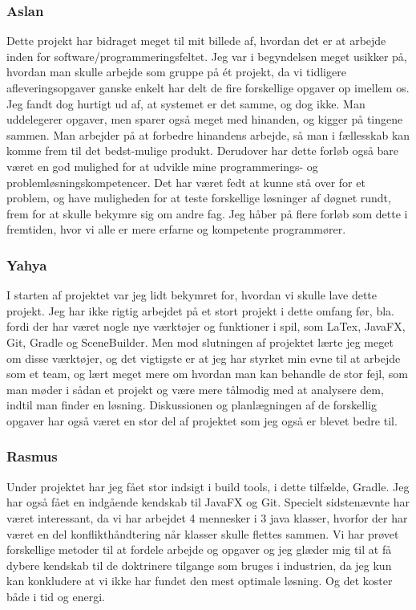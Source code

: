 \subsubsection{Aslan}\label{HHVLA}
Dette projekt har bidraget meget til mit billede af, hvordan det er at arbejde inden for software/programmeringsfeltet. Jeg var i begyndelsen meget usikker på, hvordan man skulle arbejde som gruppe på ét projekt, da vi tidligere afleveringsopgaver ganske enkelt har delt de fire forskellige opgaver op imellem os. Jeg fandt dog hurtigt ud af, at systemet er det samme, og dog ikke. Man uddelegerer opgaver, men sparer også meget med hinanden, og kigger på tingene sammen. Man arbejder på at forbedre hinandens arbejde, så man i fællesskab kan komme frem til det bedst-mulige produkt. Derudover har dette forløb også bare været en god mulighed for at udvikle mine programmerings- og problemløsningskompetencer. Det har været fedt at kunne stå over for et problem, og have muligheden for at teste forskellige løsninger af døgnet rundt, frem for at skulle bekymre sig om andre fag. Jeg håber på flere forløb som dette i fremtiden, hvor vi alle er mere erfarne og kompetente programmører.  
\subsubsection{Yahya}\label{YY}

I starten af projektet var jeg lidt bekymret for, hvordan vi skulle lave dette projekt. Jeg har ikke rigtig arbejdet på et stort projekt i dette omfang før, bla. fordi der har været nogle nye værktøjer og funktioner i spil, som LaTex, JavaFX, Git, Gradle og SceneBuilder. Men mod slutningen af projektet lærte jeg meget om disse værktøjer, og det vigtigste er at jeg har styrket min evne til at arbejde som et team, og lært meget mere om hvordan man kan behandle de stor fejl, som man møder i sådan et projekt og være mere tålmodig med at analysere dem, indtil man finder en løsning.
Diskussionen og planlægningen af de forskellig opgaver har også været en stor del af projektet som jeg også er blevet bedre til.



\subsubsection{Rasmus}\label{RR}
Under projektet har jeg fået stor indsigt i build tools, i dette tilfælde, Gradle. Jeg har også fået en indgående kendskab til JavaFX og Git. Specielt sidstenævnte har været interessant, da vi har arbejdet 4 mennesker i 3 java klasser, hvorfor der har været en del konflikthåndtering når klasser skulle flettes sammen. Vi har prøvet forskellige metoder til at fordele arbejde og opgaver og jeg glæder mig til at få dybere kendskab til de doktrinere tilgange som bruges i industrien, da jeg kun kan konkludere at vi ikke har fundet den mest optimale løsning. Og det koster både i tid og energi.
